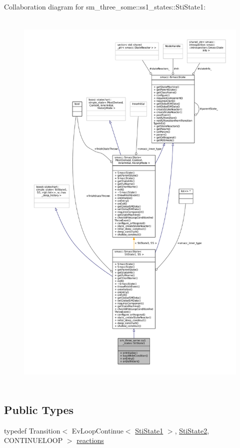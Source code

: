 Collaboration diagram for sm\+\_\+three\+\_\+some\+:\+:ss1\+\_\+states\+:\+:Sti\+State1\+:
\nopagebreak
\begin{figure}[H]
\begin{center}
\leavevmode
\includegraphics[height=550pt]{structsm__three__some_1_1ss1__states_1_1StiState1__coll__graph}
\end{center}
\end{figure}
\subsection*{Public Types}
\begin{DoxyCompactItemize}
\item 
typedef Transition$<$ Ev\+Loop\+Continue$<$ \hyperlink{structsm__three__some_1_1ss1__states_1_1StiState1}{Sti\+State1} $>$, \hyperlink{structsm__three__some_1_1ss1__states_1_1StiState2}{Sti\+State2}, C\+O\+N\+T\+I\+N\+U\+E\+L\+O\+OP $>$ \hyperlink{structsm__three__some_1_1ss1__states_1_1StiState1_aa86a8bb06736fba512abc8842f26fe1c}{reactions}
\end{DoxyCompactItemize}
